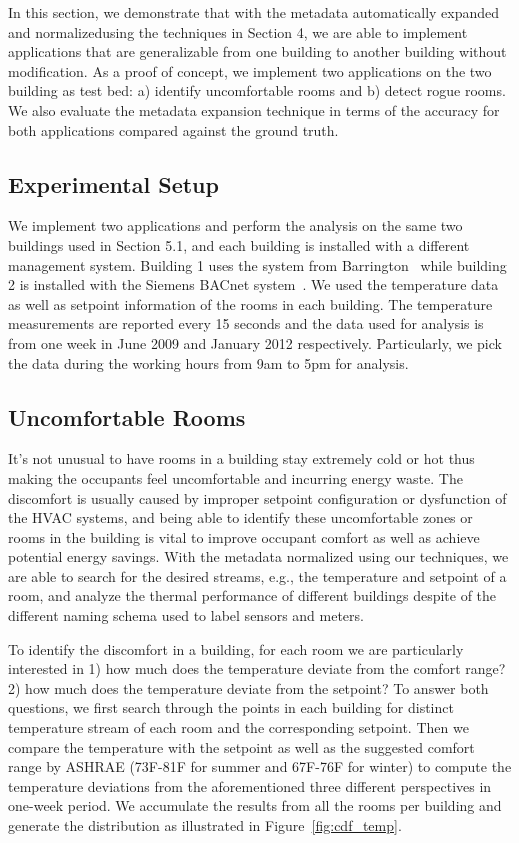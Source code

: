 In this section, we demonstrate that with the metadata automatically expanded and normalizedusing the techniques in Section 4, we are able to implement applications that are generalizable from one building to another building without modification. As a proof of concept, we implement two applications on the two building as test bed: a) identify uncomfortable rooms and b) detect rogue rooms. We also evaluate the metadata expansion technique in terms of the accuracy for both applications compared against the ground truth. 

\subsection{Experimental Setup}
We implement two applications and perform the analysis on the same two buildings used in Section 5.1, and each building is installed with a different management system. Building 1 uses the system from Barrington~\cite{1} while building 2 is installed with the Siemens BACnet system~\cite{bacnet}. We used the temperature data as well as setpoint information of the rooms in each building. The temperature measurements are reported every 15 seconds and the data used for analysis is from one week in June 2009 and January 2012 respectively. Particularly, we pick the data during the working hours from 9am to 5pm for analysis.

\subsection{Uncomfortable Rooms}
It's not unusual to have rooms in a building stay extremely cold or hot thus making the occupants feel uncomfortable and incurring energy waste. The discomfort is usually caused by improper setpoint configuration or dysfunction of the HVAC systems, and being able to identify these uncomfortable zones or rooms in the building is vital to improve occupant comfort as well as achieve potential energy savings. With the metadata normalized using our techniques, we are able to search for the desired streams, e.g., the temperature and setpoint of a room, and analyze the thermal performance of different buildings despite of the different naming schema used to label sensors and meters.

To identify the discomfort in a building, for each room we are particularly interested in 1) how much does the temperature deviate from the comfort range? 2) how much does the temperature deviate from the setpoint? To answer both questions, we first search through the points in each building for distinct temperature stream of each room and the corresponding setpoint. Then we compare the temperature with the setpoint as well as the suggested comfort range by ASHRAE (73F-81F for summer and 67F-76F for winter) to compute the temperature deviations from the aforementioned three different perspectives in one-week period. We accumulate the results from all the rooms per building and generate the distribution as illustrated in Figure~\ref{fig:cdf_temp}.

